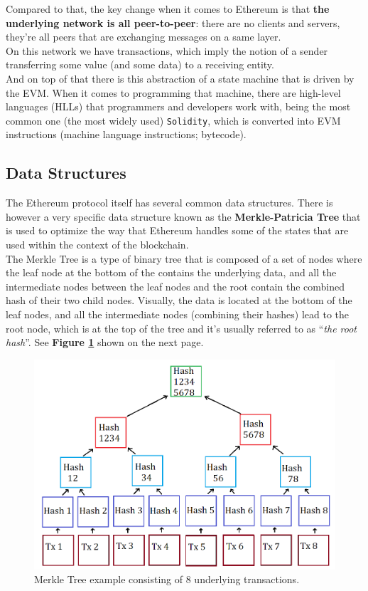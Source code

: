 Compared to that, the key change when it comes to Ethereum is that \textbf{the underlying network is all peer-to-peer}: there are no clients and servers, they're all peers that are exchanging messages on a same layer.\\

On this network we have transactions, which imply the notion of a sender transferring some value (and some data) to a receiving entity.\\

And on top of that there is this abstraction of a state machine that is driven by the EVM.
When it comes to programming that machine, there are high-level languages (HLLs) that programmers and developers work with, being the most common one (the most widely used) \texttt{Solidity}, which is converted into EVM instructions (machine language instructions; bytecode).

\subsection*{Data Structures}

The Ethereum protocol itself has several common data structures.
There is however a very specific data structure known as the \textbf{Merkle-Patricia Tree} that is used to optimize the way that Ethereum handles some of the states that are used within the context of the blockchain.\\

The Merkle Tree is a type of binary tree that is composed of a set of nodes where the leaf node at the bottom of the contains the underlying data, and all the intermediate nodes between the leaf nodes and the root contain the combined hash of their two child nodes.
Visually, the data is located at the bottom of the leaf nodes, and all the intermediate nodes (combining their hashes) lead to the root node, which is at the top of the tree and it's usually referred to as ``\textit{the root hash}''. See \textbf{Figure \ref{Merkle_tree}} shown on the next page.

\pagebreak

\begin{figure}[htbp!]
\centering
\includegraphics[width=\textwidth]{dependencies/Img/Merkle_Tree.png}
\caption{Merkle Tree example consisting of 8 underlying transactions.}
\label{Merkle_tree}
\end{figure}

